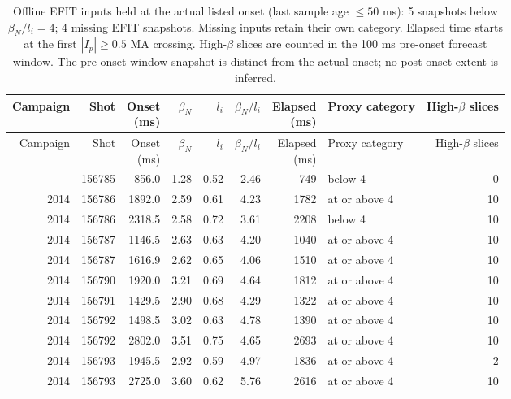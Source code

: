 \begingroup
\small
\setlength{\tabcolsep}{4pt}
\begin{longtable}{@{}rrrrrrrlr@{}}
\caption{Offline EFIT inputs held at the actual listed onset (last sample age $\leq50$ ms): 5 snapshots below $\beta_N/l_i=4$; 4 missing EFIT snapshots. Missing inputs retain their own category. Elapsed time starts at the first $|I_p|\geq0.5$ MA crossing. High-$\beta$ slices are counted in the 100 ms pre-onset forecast window. The pre-onset-window snapshot is distinct from the actual onset; no post-onset extent is inferred.} \\
\toprule
Campaign & Shot & \shortstack{Onset\\(ms)} & $\beta_N$ & $l_i$ & $\beta_N/l_i$ & \shortstack{Elapsed\\(ms)} & Proxy category & \shortstack{High-$\beta$\\slices} \\
\midrule
\endfirsthead
\toprule
Campaign & Shot & \shortstack{Onset\\(ms)} & $\beta_N$ & $l_i$ & $\beta_N/l_i$ & \shortstack{Elapsed\\(ms)} & Proxy category & \shortstack{High-$\beta$\\slices} \\
\midrule
\endhead
\midrule
\endfoot
\bottomrule
\endlastfoot
2014 & 156785 & 856.0 & 1.28 & 0.52 & 2.46 & 749 & below 4 & 0 \\
2014 & 156786 & 1892.0 & 2.59 & 0.61 & 4.23 & 1782 & at or above 4 & 10 \\
2014 & 156786 & 2318.5 & 2.58 & 0.72 & 3.61 & 2208 & below 4 & 10 \\
2014 & 156787 & 1146.5 & 2.63 & 0.63 & 4.20 & 1040 & at or above 4 & 10 \\
2014 & 156787 & 1616.9 & 2.62 & 0.65 & 4.06 & 1510 & at or above 4 & 10 \\
2014 & 156790 & 1920.0 & 3.21 & 0.69 & 4.64 & 1812 & at or above 4 & 10 \\
2014 & 156791 & 1429.5 & 2.90 & 0.68 & 4.29 & 1322 & at or above 4 & 10 \\
2014 & 156792 & 1498.5 & 3.02 & 0.63 & 4.78 & 1390 & at or above 4 & 10 \\
2014 & 156792 & 2802.0 & 3.51 & 0.75 & 4.65 & 2693 & at or above 4 & 10 \\
2014 & 156793 & 1945.5 & 2.92 & 0.59 & 4.97 & 1836 & at or above 4 & 2 \\
2014 & 156793 & 2725.0 & 3.60 & 0.62 & 5.76 & 2616 & at or above 4 & 10 \\

\end{longtable}
